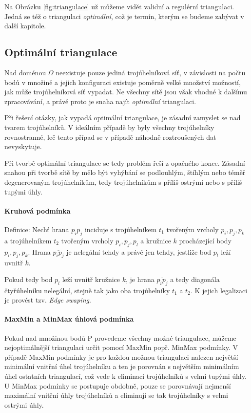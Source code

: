 \documentclass[12pt,a4paper]{article}
\begin{document}
Na Obrázku \ref{fig:triangulace} už můžeme vidět validní a regulérní triangulaci. Jedná se též o triangulaci \textit{optimální}, což je termín, kterým se budeme zabývat v další kapitole.

\newpage
\subsection{Optimální triangulace}

Nad doménou $\Omega$ neexistuje pouze jediná trojúhelníková síť, v závislosti na počtu bodů v množině a jejich konfiguraci existuje poměrně velké množství možností, jak může trojúhelníková síť vypadat. Ne všechny sítě jsou však vhodné k dalšímu zpracovávání, a právě proto je snaha najít \textit{optimální} triangulaci.

Při řešení otázky, jak vypadá optimální triangulace, je zásadní zamyslet se nad tvarem trojúhelníků. V ideálním případě by byly všechny trojúhelníky rovnostranné, leč tento případ se v případě náhodně roztroušených dat nevyskytuje.

Při tvorbě optimální triangulace se tedy problém řeší z opačného konce. Zásadní snahou při tvorbě sítě by mělo být vyhýbání se podlouhlým, štíhlým nebo téměř degenerovaným trojúhelníkům, tedy trojúhelníkům s příliš ostrými nebo s příliš tupými úhly. 

\paragraph{Kruhová podmínka}
Definice:
Nechť hrana $\overline{p_ip_j}$ inciduje s trojúhelníkem $t_1$ tvořeným vrcholy $p_i,p_j,p_k$ a trojúhelníkem $t_2$ tvořeným vrcholy $p_i,p_j,p_l$ a kružnice $k$ procházející body $p_i,p_j,p_k$. Hrana $\overline{p_ip_j}$ je nelegální tehdy a právě jen tehdy, jestliže bod $p_l$ leží uvnitř $k$.

Pokud tedy bod $p_l$ leží uvnitř kružnice $k$, je hrana $\overline{p_ip_j}$ a tedy diagonála čtyřúhelníku nelegální, stejně tak jako oba trojúhelníky $t_1$ a $t_2$. K jejich legalizaci je provést tzv. \textit{Edge swaping}.

\paragraph{MaxMin a MinMax úhlová podmínka}

Pokud nad množinou bodů P provedeme všechny možné triangulace, můžeme nejoptimálnější triangulaci určit pomocí MaxMin popř. MinMax podmínky. V případě MaxMin podmínky je pro každou možnou triangulaci nalezen největší minimální vnitřní úhel trojúhelníku a ten je porovnán s největším minimálním úhel ostatních triangulací, což vede k eliminaci trojúhelníků s velmi tupými úhly. U MinMax podmínky se postupuje obdobně, pouze se porovnávají nejmenší maximální vnitřní úhly trojúhelníků a eliminují se tak trojúhelníky s velmi ostrými úhly.
\end{document}
